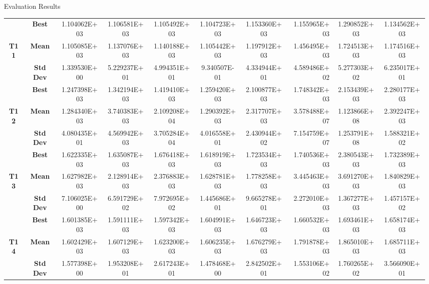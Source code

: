 \documentclass[table]{beamer}
\begin{document}
\begin{frame}{Evaluation Results}
\begin{table}[htbp]
{\begin{tabular}{|c|c|c|c|c|c|c|r|c|c|}
				\multicolumn{ 1}{|c|}{} & \textbf{Best} & 1.104062E+03 & 1.106581E+03 & 1.105492E+03 & 1.104723E+03 & 1.153360E+03 & 1.155965E+03 & 1.290852E+03 & 1.134562E+03 \\ \cline{ 2- 10}
				\multicolumn{ 1}{|c|}{\textbf{T11}} & \textbf{Mean} & 1.105085E+03 & 1.137076E+03 & 1.140188E+03 & 1.105442E+03 & 1.197912E+03 & 1.456495E+03 & 1.724513E+03 & 1.174516E+03 \\ \cline{ 2- 10}
				\multicolumn{ 1}{|c|}{} & \textbf{Std Dev} & 1.339530E+00 & 5.229237E+01 & 4.994351E+01 & 9.340507E-01 & 4.334944E+01 & 4.589486E+02 & 5.277303E+02 & 6.235017E+01 \\ \hline
				\multicolumn{ 1}{|c|}{} & \textbf{Best} & 1.247398E+03 & 1.342194E+03 & 1.419410E+03 & 1.259420E+03 & 2.100877E+03 & 1.748342E+03 & 2.153439E+03 & 2.280177E+03 \\ \cline{ 2- 10}
				\multicolumn{ 1}{|c|}{\textbf{T12}} & \textbf{Mean} & 1.284340E+03 & 3.740383E+03 & 2.109208E+04 & 1.290392E+03 & 2.317707E+03 & 3.578488E+07 & 1.123866E+08 & 2.392247E+03 \\ \cline{ 2- 10}
				\multicolumn{ 1}{|c|}{} & \textbf{Std Dev} & 4.080435E+01 & 4.569942E+03 & 3.705284E+04 & 4.016558E+01 & 2.430944E+02 & 7.154759E+07 & 1.253791E+08 & 1.588321E+02 \\ \hline
				\multicolumn{ 1}{|c|}{} & \textbf{Best} & 1.622335E+03 & 1.635087E+03 & 1.676418E+03 & 1.618919E+03 & 1.723534E+03 & 1.740536E+03 & 2.380543E+03 & 1.732389E+03 \\ \cline{ 2- 10}
				\multicolumn{ 1}{|c|}{\textbf{T13}} & \textbf{Mean} & 1.627982E+03 & 2.128914E+03 & 2.376883E+03 & 1.628781E+03 & 1.778258E+03 & 3.445463E+03 & 3.691270E+03 & 1.840829E+03 \\ \cline{ 2- 10}
				\multicolumn{ 1}{|c|}{} & \textbf{Std Dev} & 7.106025E+00 & 6.591729E+02 & 7.972695E+02 & 1.445686E+01 & 9.665278E+01 & 2.272010E+03 & 1.367277E+03 & 1.457157E+02 \\ \hline
				\multicolumn{ 1}{|c|}{} & \textbf{Best} & 1.601385E+03 & 1.591111E+03 & 1.597342E+03 & 1.604991E+03 & 1.646723E+03 & 1.660532E+03 & 1.693461E+03 & 1.658174E+03 \\ \cline{ 2- 10}
				\multicolumn{ 1}{|c|}{\textbf{T14}} & \textbf{Mean} & 1.602429E+03 & 1.607129E+03 & 1.623200E+03 & 1.606235E+03 & 1.676279E+03 & 1.791878E+03 & 1.865010E+03 & 1.685711E+03 \\ \cline{ 2- 10}
				\multicolumn{ 1}{|c|}{} & \textbf{Std Dev} & 1.577398E+00 & 1.953208E+01 & 2.617243E+01 & 1.478468E+00 & 2.842502E+01 & 1.553106E+02 & 1.760265E+02 & 3.566090E+01 \\ \hline

\end{tabular}}
\end{table}
\end{frame}
\end{document}
